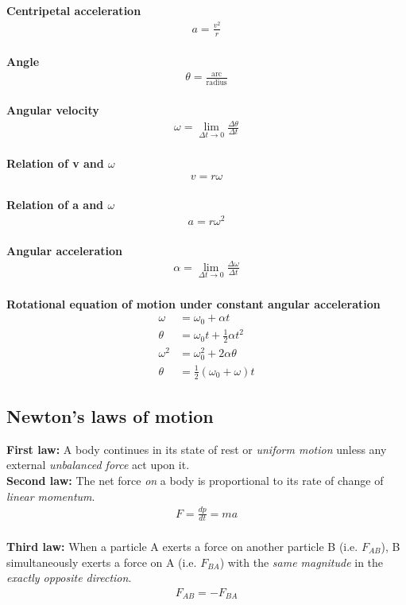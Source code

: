\documentclass[12pt,a4paper]{article}
\begin{document}
\noindent\textbf{Centripetal acceleration}
\begin{align}
a = \frac{v^{2}}{r}
\end{align}
\\
\textbf{Angle}
\begin{align}
\theta = \frac{\text{arc}}{\text{radius}}
\end{align}
\\
\textbf{Angular velocity}
\begin{align}
\omega = \lim_{\Delta t \to 0}\frac{\Delta \theta}{\Delta t}
\end{align}
\\
\textbf{Relation of v and $\omega$}
\begin{align}
v = r\omega
\end{align}
\\
\textbf{Relation of a and $\omega$}
\begin{align}
a = r\omega^{2}
\end{align}
\\
\textbf{Angular acceleration}
\begin{align}
\alpha = \lim_{\Delta t \to 0}\frac{\Delta \omega}{\Delta t}
\end{align}
\\
\textbf{Rotational equation of motion under constant angular acceleration}
\begin{align}
\omega &= \omega_{0} + \alpha t \\
\theta &= \omega_{0}t + \frac{1}{2}\alpha t^{2} \\
\omega^{2} &= \omega_{0}^{2} + 2\alpha \theta \\
\theta &= \frac{1}{2}(\omega_{0} + \omega)t
\end{align}

\subsection{Newton's laws of motion}

\noindent\textbf{First law:} A body continues in its state of rest or \emph{uniform motion} unless any external \emph{unbalanced force} act upon it.
\\
\textbf{Second law:} The net force \emph{on} a body is proportional to its rate of change of \emph{linear momentum}.
\begin{align}
F = \frac{dp}{dt} = ma
\end{align}
\\
\textbf{Third law:} When a particle A exerts a force on another particle B (i.e. $F_{AB}$), B simultaneously exerts a force on A (i.e. $F_{BA}$) with the \emph{same magnitude} in the \emph{exactly opposite direction}.
\begin{align}
F_{AB} = - F_{BA}
\end{align}
\end{document}
